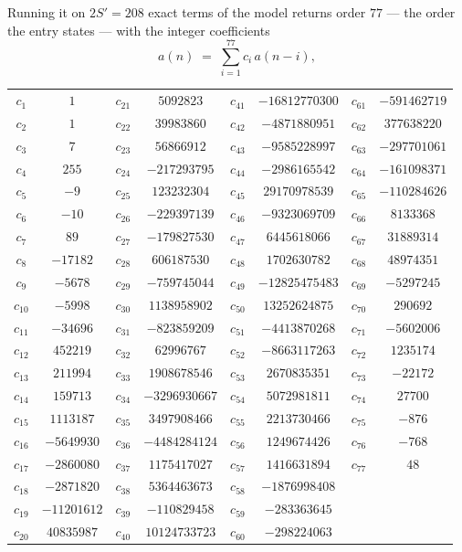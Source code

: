 \documentclass[11pt,a4paper]{article}
\theoremstyle{plain}
\theoremstyle{definition}
\begin{document}
Running it on $2S'=208$ exact terms of the model returns order $77$ --- the order the
entry states --- with the integer coefficients
\[
a(n)\;=\;\sum_{i=1}^{77}c_i\,a(n-i),
\]
\begin{center}\small
\begin{tabular}{cccccccc}
$c_{1}$ & $1$ & $c_{21}$ & $5092823$ & $c_{41}$ & $-16812770300$ & $c_{61}$ & $-591462719$ \\
$c_{2}$ & $1$ & $c_{22}$ & $39983860$ & $c_{42}$ & $-4871880951$ & $c_{62}$ & $377638220$ \\
$c_{3}$ & $7$ & $c_{23}$ & $56866912$ & $c_{43}$ & $-9585228997$ & $c_{63}$ & $-297701061$ \\
$c_{4}$ & $255$ & $c_{24}$ & $-217293795$ & $c_{44}$ & $-2986165542$ & $c_{64}$ & $-161098371$ \\
$c_{5}$ & $-9$ & $c_{25}$ & $123232304$ & $c_{45}$ & $29170978539$ & $c_{65}$ & $-110284626$ \\
$c_{6}$ & $-10$ & $c_{26}$ & $-229397139$ & $c_{46}$ & $-9323069709$ & $c_{66}$ & $8133368$ \\
$c_{7}$ & $89$ & $c_{27}$ & $-179827530$ & $c_{47}$ & $6445618066$ & $c_{67}$ & $31889314$ \\
$c_{8}$ & $-17182$ & $c_{28}$ & $606187530$ & $c_{48}$ & $1702630782$ & $c_{68}$ & $48974351$ \\
$c_{9}$ & $-5678$ & $c_{29}$ & $-759745044$ & $c_{49}$ & $-12825475483$ & $c_{69}$ & $-5297245$ \\
$c_{10}$ & $-5998$ & $c_{30}$ & $1138958902$ & $c_{50}$ & $13252624875$ & $c_{70}$ & $290692$ \\
$c_{11}$ & $-34696$ & $c_{31}$ & $-823859209$ & $c_{51}$ & $-4413870268$ & $c_{71}$ & $-5602006$ \\
$c_{12}$ & $452219$ & $c_{32}$ & $62996767$ & $c_{52}$ & $-8663117263$ & $c_{72}$ & $1235174$ \\
$c_{13}$ & $211994$ & $c_{33}$ & $1908678546$ & $c_{53}$ & $2670835351$ & $c_{73}$ & $-22172$ \\
$c_{14}$ & $159713$ & $c_{34}$ & $-3296930667$ & $c_{54}$ & $5072981811$ & $c_{74}$ & $27700$ \\
$c_{15}$ & $1113187$ & $c_{35}$ & $3497908466$ & $c_{55}$ & $2213730466$ & $c_{75}$ & $-876$ \\
$c_{16}$ & $-5649930$ & $c_{36}$ & $-4484284124$ & $c_{56}$ & $1249674426$ & $c_{76}$ & $-768$ \\
$c_{17}$ & $-2860080$ & $c_{37}$ & $1175417027$ & $c_{57}$ & $1416631894$ & $c_{77}$ & $48$ \\
$c_{18}$ & $-2871820$ & $c_{38}$ & $5364463673$ & $c_{58}$ & $-1876998408$ &  &  \\
$c_{19}$ & $-11201612$ & $c_{39}$ & $-110829458$ & $c_{59}$ & $-283363645$ &  &  \\
$c_{20}$ & $40835987$ & $c_{40}$ & $10124733723$ & $c_{60}$ & $-298224063$ &  &  \\
\end{tabular}
\end{center}
\end{document}

